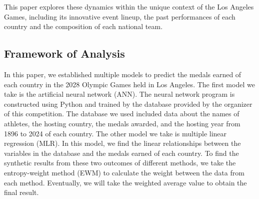 \documentclass{mcmthesis}
\begin{document}
This paper explores these dynamics within the unique context of the Los Angeles Games, including its innovative event lineup, the past performances of each country and the composition of each national team.

\subsection{Framework of Analysis}
In this paper, we established multiple models to predict the medals earned of each country in the 2028 Olympic Games held in Los Angeles. The first model we take is the artificial neural network (ANN). The neural network program is constructed using Python and trained by the database provided by the organizer of this competition. The database we used included data about the names of athletes, the hosting country, the medals awarded, and the hosting year from 1896 to 2024 of each country. The other model we take is multiple linear regression (MLR). In this model, we find the linear relationships between the variables in the database and the medals earned of each country. To find the synthetic results from these two outcomes of different methods, we take the entropy-weight method (EWM) to calculate the weight between the data from each method. Eventually, we will take the weighted average value to obtain the final result.  
\end{document}
